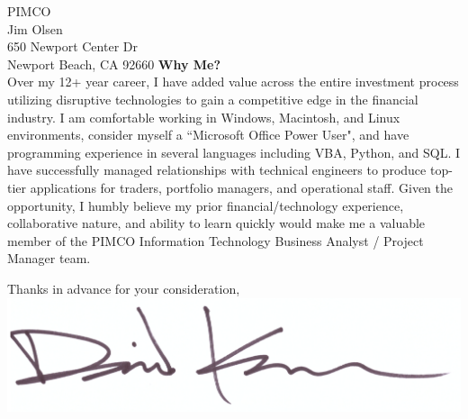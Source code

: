 \documentclass{letter}
\begin{document}
\begin{letter}{
  PIMCO \\
  Jim Olsen \\
  650 Newport Center Dr \\
  Newport Beach, CA 92660
}
\textbf{Why Me?} \\
Over my 12+ year career, I have added value across the entire investment process
utilizing disruptive technologies to gain a competitive edge in the
financial industry. I am comfortable working in Windows, Macintosh, and Linux
environments, consider myself a ``Microsoft Office Power User", and have programming
experience in several languages including VBA, Python, and SQL. I have successfully
managed relationships with technical engineers to produce top-tier applications
for traders, portfolio managers, and operational staff. Given the opportunity, I
humbly believe my prior financial/technology experience, collaborative nature,
and ability to learn quickly would make me a valuable member of the PIMCO Information
Technology Business Analyst / Project Manager team. \\

\vspace{-0.1in}
 
\closing{
  Thanks in advance for your consideration, \\
  \vspace{.15in}
  \includegraphics[scale=0.25]{signature.png}
}

\end{letter}
\end{document}
